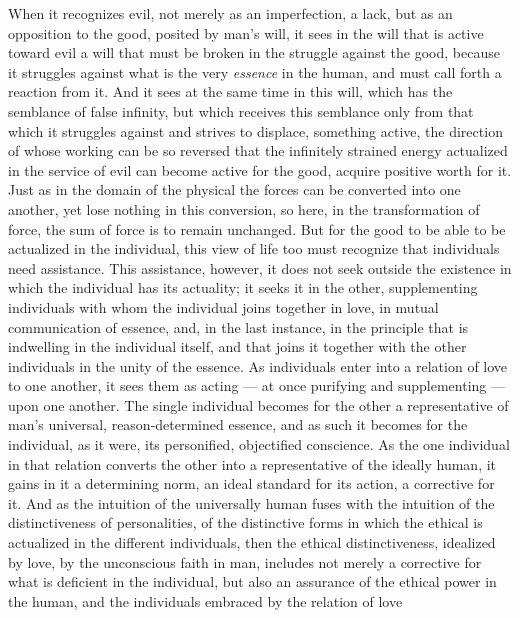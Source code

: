 \documentclass[12pt,a4paper,openany]{book}
\newcommand{\opage}[1]{\marginnote{\footnotesize\textit{[#1]}}}
\begin{document}
When it recognizes evil, not merely as an imperfection,
a lack, but as an opposition to the good, posited by man's will,
it sees in the will that
is active toward evil a will that must be broken in the struggle
against the good, because it struggles against what is the very
\emph{essence} in the human, and must call forth a reaction
from it. And it sees at the same time in this will, which has the
semblance of false infinity, but which receives this semblance only from
that which it struggles against and strives to displace, something active,
\opage{506}the direction of whose working can be so reversed that the
infinitely strained energy actualized in the service of evil can
become active for the good, acquire positive worth for it. Just as
in the domain of the physical the forces can be converted into one another,
yet lose nothing in this conversion, so here, in
the transformation of force, the sum of force is to remain unchanged.
But for the good to be able to be actualized in the individual, this
view of life too must recognize that individuals need
assistance. This assistance, however, it does not seek outside the
existence in which the individual has its actuality; it seeks
it in the other, supplementing individuals with whom the individual
joins together in love, in mutual communication of essence,
and, in the last instance, in the principle that is indwelling in the individual itself,
and that joins it together with the other individuals
in the unity of the essence. As individuals enter into a relation of love
to one another, it sees them as acting --- at
once purifying and supplementing --- upon one another. The
single individual becomes for the other a representative of
man's universal, reason-determined essence, and as such
it becomes for the individual, as it were, its personified, objectified
conscience. As the one individual in that relation
converts the other into a representative of the ideally human,
it gains in it a determining norm, an ideal standard
for its action, a corrective for it. And as the intuition
of the universally human fuses with
the intuition of the distinctiveness of personalities, of the distinctive
forms in which the ethical is actualized in the different
individuals, then the ethical distinctiveness, idealized by love, by the
unconscious faith in man, includes
not merely a corrective for what is deficient in the individual,
but also an assurance of the ethical power in
the human, and the individuals embraced by the relation of love
\end{document}
